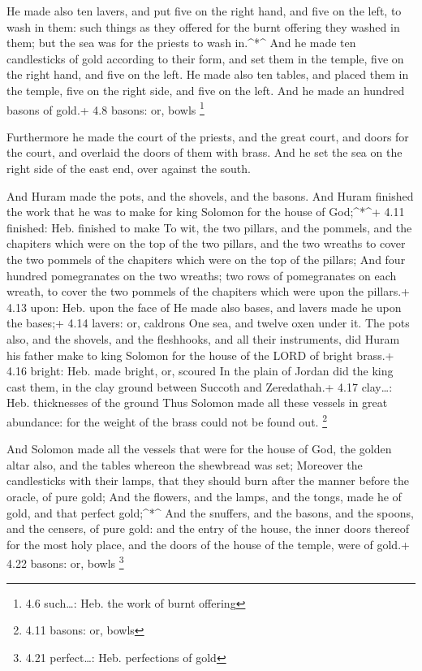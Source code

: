  He made also ten lavers, and put five on the right hand,
and five on the left, to wash in them: such things as they offered for
the burnt offering they washed in them; but the sea was for the priests
to wash in.\^{}*\^{}  And he made ten candlesticks of gold
according to their form, and set them in the temple, five on the right
hand, and five on the left.  He made also ten tables, and
placed them in the temple, five on the right side, and five on the left.
And he made an hundred basons of gold.+ 4.8 basons: or, bowls
\footnote{4.6 such\ldots: Heb. the work of burnt offering}

 Furthermore he made the court of the priests, and the great
court, and doors for the court, and overlaid the doors of them with
brass.  And he set the sea on the right side of the east
end, over against the south.

 And Huram made the pots, and the shovels, and the basons.
And Huram finished the work that he was to make for king Solomon for the
house of God;\^{}*\^{}+ 4.11 finished: Heb. finished to make
 To wit, the two pillars, and the pommels, and the
chapiters which were on the top of the two pillars, and the two wreaths
to cover the two pommels of the chapiters which were on the top of the
pillars;  And four hundred pomegranates on the two wreaths;
two rows of pomegranates on each wreath, to cover the two pommels of the
chapiters which were upon the pillars.+ 4.13 upon: Heb. upon the face of
 He made also bases, and lavers made he upon the bases;+
4.14 lavers: or, caldrons  One sea, and twelve oxen under
it.  The pots also, and the shovels, and the fleshhooks,
and all their instruments, did Huram his father make to king Solomon for
the house of the LORD of bright brass.+ 4.16 bright: Heb. made bright,
or, scoured  In the plain of Jordan did the king cast them,
in the clay ground between Succoth and Zeredathah.+ 4.17 clay\ldots:
Heb. thicknesses of the ground  Thus Solomon made all these
vessels in great abundance: for the weight of the brass could not be
found out. \footnote{4.11 basons: or, bowls}

 And Solomon made all the vessels that were for the house
of God, the golden altar also, and the tables whereon the shewbread was
set;  Moreover the candlesticks with their lamps, that they
should burn after the manner before the oracle, of pure gold;
 And the flowers, and the lamps, and the tongs, made he of
gold, and that perfect gold;\^{}*\^{}  And the snuffers,
and the basons, and the spoons, and the censers, of pure gold: and the
entry of the house, the inner doors thereof for the most holy place, and
the doors of the house of the temple, were of gold.+ 4.22 basons: or,
bowls \footnote{4.21 perfect\ldots: Heb. perfections of gold}

